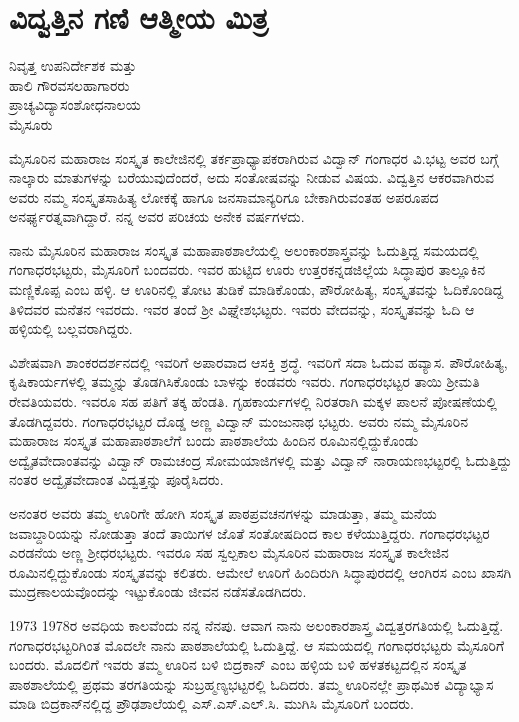 {\fontsize{14}{16}\selectfont
{}
\chapter{ವಿದ್ವತ್ತಿನ ಗಣಿ ಆತ್ಮೀಯ ಮಿತ್ರ}

\begin{center}
\smallskip
ನಿವೃತ್ತ ಉಪನಿರ್ದೇಶಕ ಮತ್ತು\\ 
ಹಾಲಿ ಗೌರವಸಲಹಾಗಾರರು\\
ಪ್ರಾಚ್ಯವಿದ್ಯಾಸಂಶೋಧನಾಲಯ\\
ಮೈಸೂರು
\addrule
\end{center}

ಮೈಸೂರಿನ ಮಹಾರಾಜ ಸಂಸ್ಕೃತ ಕಾಲೇಜಿನಲ್ಲಿ ತರ್ಕಪ್ರಾಧ್ಯಾಪಕರಾಗಿರುವ ವಿದ್ವಾನ್ ಗಂಗಾಧರ ವಿ.ಭಟ್ಟ ಅವರ ಬಗ್ಗೆ ನಾಲ್ಕಾರು ಮಾತುಗಳನ್ನು ಬರೆಯುವುದೆಂದರೆ, ಅದು ಸಂತೋಷವನ್ನು ನೀಡುವ ವಿಷಯ. ವಿದ್ವತ್ತಿನ ಆಕರವಾಗಿರುವ ಅವರು ನಮ್ಮ ಸಂಸ್ಕೃತಸಾಹಿತ್ಯ ಲೋಕಕ್ಕೆ ಹಾಗೂ ಜನಸಾಮಾನ್ಯರಿಗೂ ಬೇಕಾಗಿರುವಂತಹ ಅಪರೂಪದ ಅನರ್ಘ್ಯರತ್ನವಾಗಿದ್ದಾರೆ. ನನ್ನ ಅವರ ಪರಿಚಯ ಅನೇಕ ವರ್ಷಗಳದು. 

ನಾನು ಮೈಸೂರಿನ ಮಹಾರಾಜ ಸಂಸ್ಕೃತ ಮಹಾಪಾಠಶಾಲೆಯಲ್ಲಿ ಅಲಂಕಾರ\-ಶಾಸ್ತ್ರವನ್ನು ಓದುತ್ತಿದ್ದ ಸಮಯದಲ್ಲಿ ಗಂಗಾಧರಭಟ್ಟರು, ಮೈಸೂರಿಗೆ ಬಂದವರು. ಇವರ ಹುಟ್ಟಿದ ಊರು ಉತ್ತರಕನ್ನಡಜಿಲ್ಲೆಯ ಸಿದ್ಧಾಪುರ ತಾಲ್ಲೂಕಿನ ಮಣ್ಣಿಕೊಪ್ಪ ಎಂಬ ಹಳ್ಳಿ. ಆ ಊರಿನಲ್ಲಿ ತೋಟ  \enginline{-}  ತುಡಿಕೆ ಮಾಡಿಕೊಂಡು, ಪೌರೋಹಿತ್ಯ, ಸಂಸ್ಕೃತವನ್ನು ಓದಿಕೊಂಡಿದ್ದ ತಿಳಿದವರ ಮನೆತನ ಇವರದು. ಇವರ ತಂದೆ ಶ್ರೀ ವಿಘ್ನೇಶಭಟ್ಟರು. ಇವರು ವೇದವನ್ನು, ಸಂಸ್ಕೃತವನ್ನು ಓದಿ ಆ ಹಳ್ಳಿಯಲ್ಲಿ ಬಲ್ಲವರಾಗಿದ್ದರು.

ವಿಶೇಷವಾಗಿ ಶಾಂಕರದರ್ಶನದಲ್ಲಿ ಇವರಿಗೆ ಅಪಾರವಾದ ಆಸಕ್ತಿ ಶ್ರದ್ಧೆ. ಇವರಿಗೆ ಸದಾ ಓದುವ ಹವ್ಯಾಸ. ಪೌರೋಹಿತ್ಯ, ಕೃಷಿಕಾರ್ಯಗಳಲ್ಲಿ ತಮ್ಮನ್ನು ತೊಡಗಿಸಿಕೊಂಡು ಬಾಳನ್ನು ಕಂಡವರು ಇವರು. ಗಂಗಾಧರಭಟ್ಟರ ತಾಯಿ ಶ್ರೀಮತಿ ರೇವತಿಯವರು. ಇವರೂ ಸಹ ಪತಿಗೆ ತಕ್ಕ ಹೆಂಡತಿ. ಗೃಹಕಾರ್ಯಗಳಲ್ಲಿ ನಿರತರಾಗಿ ಮಕ್ಕಳ ಪಾಲನೆ ಪೋಷಣೆಯಲ್ಲಿ ತೊಡಗಿದ್ದವರು. ಗಂಗಾಧರಭಟ್ಟರ ದೊಡ್ಡ ಅಣ್ಣ ವಿದ್ವಾನ್ ಮಂಜುನಾಥ ಭಟ್ಟರು. ಅವರು ನಮ್ಮ ಮೈಸೂರಿನ ಮಹಾರಾಜ ಸಂಸ್ಕೃತ ಮಹಾ\-ಪಾಠಶಾಲೆಗೆ ಬಂದು ಪಾಠಶಾಲೆಯ ಹಿಂದಿನ ರೂಮಿನಲ್ಲಿದ್ದುಕೊಂಡು ಅದ್ವೈತವೇದಾಂತ\-ವನ್ನು ವಿದ್ವಾನ್ ರಾಮಚಂದ್ರ ಸೋಮಯಾಜಿಗಳಲ್ಲಿ ಮತ್ತು ವಿದ್ವಾನ್ ನಾರಾಯಣಭಟ್ಟರಲ್ಲಿ ಓದುತ್ತಿದ್ದು ನಂತರ ಅದ್ವೈತವೇದಾಂತ ವಿದ್ವತ್ತನ್ನು ಪೂರೈಸಿದರು. 
\vskip 3pt

ಅನಂತರ ಅವರು ತಮ್ಮ ಊರಿಗೇ ಹೋಗಿ ಸಂಸ್ಕೃತ ಪಾಠಪ್ರವಚನಗಳನ್ನು ಮಾಡುತ್ತಾ, ತಮ್ಮ ಮನೆಯ ಜವಾಬ್ದಾರಿಯನ್ನು ನೋಡುತ್ತಾ ತಂದೆ  \enginline{-}  ತಾಯಿಗಳ ಜೊತೆ ಸಂತೋಷದಿಂದ ಕಾಲ ಕಳೆಯುತ್ತಿದ್ದರು. ಗಂಗಾಧರಭಟ್ಟರ ಎರಡನೆಯ ಅಣ್ಣ ಶ್ರೀಧರಭಟ್ಟರು. ಇವರೂ ಸಹ ಸ್ವಲ್ಪಕಾಲ ಮೈಸೂರಿನ ಮಹಾರಾಜ ಸಂಸ್ಕೃತ ಕಾಲೇಜಿನ ರೂಮಿನಲ್ಲಿದ್ದುಕೊಂಡು ಸಂಸ್ಕೃತವನ್ನು ಕಲಿತರು. ಆಮೇಲೆ ಊರಿಗೆ ಹಿಂದಿರುಗಿ ಸಿದ್ಧಾಪುರದಲ್ಲಿ ಆಂಗಿರಸ ಎಂಬ ಖಾಸಗಿ ಮುದ್ರಣಾಲಯವೊಂದನ್ನು ಇಟ್ಟುಕೊಂಡು ಜೀವನ ನಡೆಸತೊಡಗಿದರು.
\vskip 3pt

1973  \enginline{-}  1978ರ ಅವಧಿಯ ಕಾಲವೆಂದು ನನ್ನ ನೆನಪು. ಆವಾಗ ನಾನು ಅಲಂಕಾರ\-ಶಾಸ್ತ್ರ ವಿದ್ವತ್ತರಗತಿಯಲ್ಲಿ ಓದುತ್ತಿದ್ದೆ. ಗಂಗಾಧರಭಟ್ಟರಿಗಿಂತ ಮೊದಲೇ ನಾನು ಪಾಠಶಾಲೆಯಲ್ಲಿ ಓದುತ್ತಿದ್ದೆ. ಆ ಸಮಯದಲ್ಲಿ ಗಂಗಾಧರಭಟ್ಟರು ಮೈಸೂರಿಗೆ ಬಂದರು. ಮೊದಲಿಗೆ ಇವರು ತಮ್ಮ ಊರಿನ ಬಳಿ ಬಿದ್ರಕಾನ್ ಎಂಬ ಹಳ್ಳಿಯ ಬಳಿ ಹಳತಕಟ್ಟದಲ್ಲಿನ ಸಂಸ್ಕೃತ ಪಾಠಶಾಲೆಯಲ್ಲಿ ಪ್ರಥಮ ತರಗತಿಯನ್ನು ಸುಬ್ರಹ್ಮಣ್ಯಭಟ್ಟರಲ್ಲಿ ಓದಿದರು. ತಮ್ಮ ಊರಿನಲ್ಲೇ ಪ್ರಾಥಮಿಕ ವಿದ್ಯಾಭ್ಯಾಸ ಮಾಡಿ ಬಿದ್ರಕಾನ್‍ನಲ್ಲಿದ್ದ ಪ್ರೌಢ\-ಶಾಲೆಯಲ್ಲಿ ಎಸ್.ಎಸ್.ಎಲ್.ಸಿ. ಮುಗಿಸಿ ಮೈಸೂರಿಗೆ ಬಂದರು.
\vskip 3pt

}
